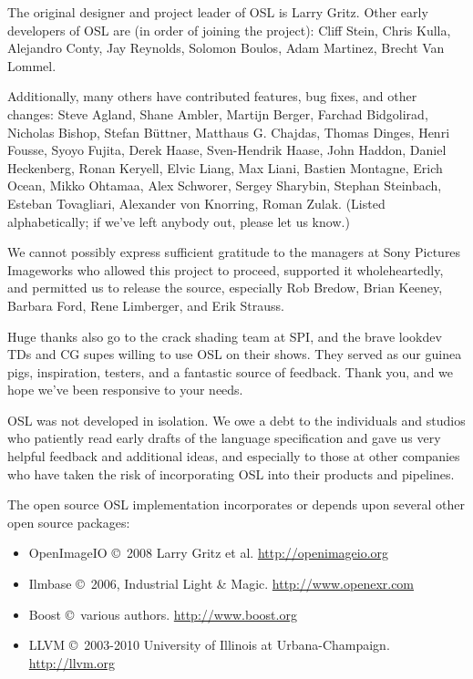 \documentclass[11pt,letterpaper]{book}
\begin{document}
The original designer and project leader of OSL is Larry Gritz. Other early
developers of OSL are (in order of joining the project): Cliff Stein, Chris
Kulla, Alejandro Conty, Jay Reynolds, Solomon Boulos, Adam Martinez, Brecht
Van Lommel.

Additionally, many others have contributed features, bug fixes, and other
changes: Steve Agland, Shane Ambler, Martijn Berger, Farchad Bidgolirad,
Nicholas Bishop, Stefan Büttner, Matthaus G. Chajdas, Thomas Dinges, Henri
Fousse, Syoyo Fujita, Derek Haase, Sven-Hendrik Haase, John Haddon, Daniel
Heckenberg, Ronan Keryell, Elvic Liang, Max Liani, Bastien Montagne, Erich
Ocean, Mikko Ohtamaa, Alex Schworer, Sergey Sharybin, Stephan Steinbach,
Esteban Tovagliari, Alexander von Knorring, Roman Zulak. (Listed
alphabetically; if we've left anybody out, please let us know.)

We cannot possibly express sufficient gratitude to the managers at Sony
Pictures Imageworks who allowed this project to proceed, supported it
wholeheartedly, and permitted us to release the source, especially Rob
Bredow, Brian Keeney, Barbara Ford, Rene Limberger, and Erik Strauss.

Huge thanks also go to the crack shading team at SPI, and the brave
lookdev TDs and CG supes willing to use OSL on their shows.  They served
as our guinea pigs, inspiration, testers, and a fantastic source of
feedback.  Thank you, and we hope we've been responsive to your needs.

OSL was not developed in isolation.  We owe a debt to the individuals
and studios who patiently read early drafts of the language
specification and gave us very helpful feedback and additional ideas,
and especially to those at other companies who have taken the risk of
incorporating OSL into their products and pipelines.

\bigskip
The open source OSL implementation incorporates or depends upon several
other open source packages:

\begin{itemize}
\item {\cf OpenImageIO} \copyright\ 2008 Larry Gritz et al.  
\url{http://openimageio.org}
\item Ilmbase \copyright\ 2006, Industrial Light \& Magic.
\url{http://www.openexr.com}
\item Boost \copyright\ various authors.  \url{http://www.boost.org}
\item LLVM \copyright\ 2003-2010 University of Illinois at
  Urbana-Champaign. \url{http://llvm.org}
\end{itemize}
\end{document}

